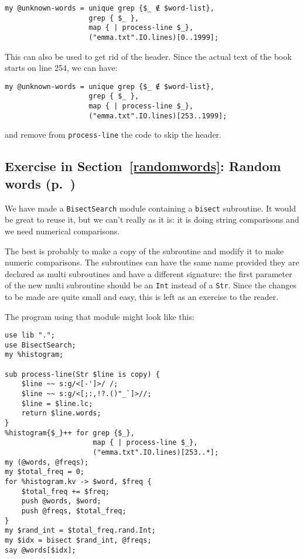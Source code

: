{\begin{verbatim}
my @unknown-words = unique grep {$_ ∉ $word-list}, 
                    grep { $_ }, 
                    map { | process-line $_},  
                    ("emma.txt".IO.lines)[0..1999]; 
\end{verbatim}

This can also be used to get rid of the header. Since the 
actual text of the book starts on line 254, we can have:

\begin{verbatim}
my @unknown-words = unique grep {$_ ∉ $word-list}, 
                    grep { $_ }, 
                    map { | process-line $_},  
                    ("emma.txt".IO.lines)[253..1999]; 
\end{verbatim}
and remove from {\tt process-line} the code to skip the header.

\subsection{Exercise in Section~\ref{randomwords}: Random words (p.~\pageref{randhist})}
\label{sol_randhist}

We have made a {\tt BisectSearch} module containing a {\tt bisect} 
subroutine. It would be great to reuse it, but we can't really 
as it is: it is doing string comparisons and we need numerical  comparisons.
 
The best is probably to make a copy of the subroutine and modify it 
to make numeric comparisons. The subroutines can have the same 
name provided they are declared as multi subroutines and have 
a different signature: the first parameter of the new multi 
subroutine should be an {\tt Int} instead of a {\tt Str}. Since 
the changes to be made are quite small and easy, this is 
left as an exercise to the reader.

The program using that module might look like this:

\begin{verbatim}
use lib ".";
use BisectSearch;
my %histogram;

sub process-line(Str $line is copy) {
    $line ~~ s:g/<[-']>/ /; 
    $line ~~ s:g/<[;:,!?.()"_`]>//; 
    $line = $line.lc; 
    return $line.words;
}
%histogram{$_}++ for grep {$_},
                     map { | process-line $_}, 
                     ("emma.txt".IO.lines)[253..*]; 
my (@words, @freqs);
my $total_freq = 0;
for %histogram.kv -> $word, $freq {
    $total_freq += $freq;
    push @words, $word;
    push @freqs, $total_freq;
}
my $rand_int = $total_freq.rand.Int;
my $idx = bisect $rand_int, @freqs;
say @words[$idx];
\end{verbatim}

}
